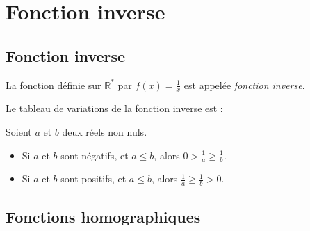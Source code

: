 \chapter{Fonction inverse}
\section{Fonction inverse}

\begin{definition}
  La fonction définie sur $\mathbb R^*$ par $f(x)=\frac{1}{x}$ est appelée \emph{fonction inverse}.
\end{definition}

\begin{propriete}[Variations]
  Le tableau de variations de la fonction inverse est :
  \begin{center}
    \hfill
  \end{center}
\end{propriete}

\begin{propriete}
  Soient $a$ et $b$ deux réels non nuls.
  \begin{itemize}
    \item Si $a$ et $b$ sont négatifs, et $a\leq b$, alors $0>\frac{1}{a}\geq\frac{1}{b}$.
    \item Si $a$ et $b$ sont positifs, et $a\leq b$, alors $\frac{1}{a}\geq\frac{1}{b}>0$.
  \end{itemize}
\end{propriete}

\section{Fonctions homographiques}

